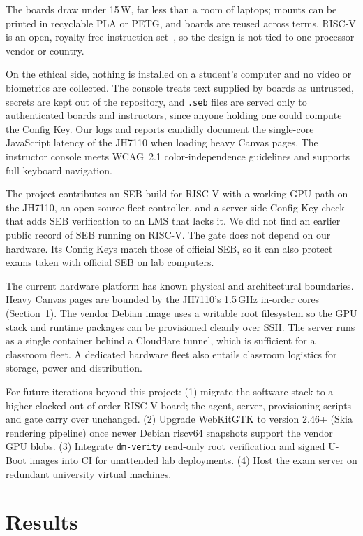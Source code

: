 \documentclass[11pt]{article}
\begin{document}
The boards draw under 15\,W, far less than a room of laptops; mounts can be printed in recyclable PLA or PETG, and boards are reused across terms. RISC-V is an open, royalty-free instruction set~\cite{asanovic2014}, so the design is not tied to one processor vendor or country.

On the ethical side, nothing is installed on a student's computer and no video or biometrics are collected. The console treats text supplied by boards as untrusted, secrets are kept out of the repository, and \texttt{.seb} files are served only to authenticated boards and instructors, since anyone holding one could compute the Config Key. Our logs and reports candidly document the single-core JavaScript latency of the JH7110 when loading heavy Canvas pages. The instructor console meets WCAG~2.1 color-independence guidelines and supports full keyboard navigation.

The project contributes an SEB build for RISC-V with a working GPU path on the JH7110, an open-source fleet controller, and a server-side Config Key check that adds SEB verification to an LMS that lacks it. We did not find an earlier public record of SEB running on RISC-V. The gate does not depend on our hardware. Its Config Keys match those of official SEB, so it can also protect exams taken with official SEB on lab computers.

The current hardware platform has known physical and architectural boundaries. Heavy Canvas pages are bounded by the JH7110's 1.5\,GHz in-order cores (Section~\ref{sec:results}). The vendor Debian image uses a writable root filesystem so the GPU stack and runtime packages can be provisioned cleanly over SSH. The server runs as a single container behind a Cloudflare tunnel, which is sufficient for a classroom fleet. A dedicated hardware fleet also entails classroom logistics for storage, power and distribution.

For future iterations beyond this project: (1) migrate the software stack to a higher-clocked out-of-order RISC-V board; the agent, server, provisioning scripts and gate carry over unchanged. (2) Upgrade WebKitGTK to version 2.46+ (Skia rendering pipeline) once newer Debian riscv64 snapshots support the vendor GPU blobs. (3) Integrate \texttt{dm-verity} read-only root verification and signed U-Boot images into CI for unattended lab deployments. (4) Host the exam server on redundant university virtual machines.

\section{Results}
\label{sec:results}
\end{document}
